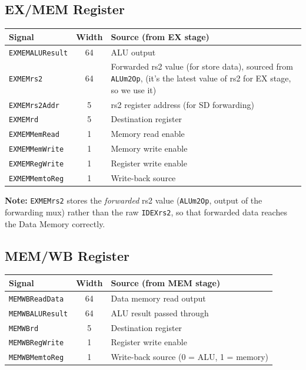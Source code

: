 \documentclass[12pt,a4paper]{article}
\begin{document}
\subsection{EX/MEM Register}
\begin{center}
\begin{tabular}{lcp{7cm}}
    \toprule
    \textbf{Signal} & \textbf{Width} & \textbf{Source (from EX stage)} \\
    \midrule
    \texttt{EXMEMALUResult} & 64 & ALU output \\
    \texttt{EXMEMrs2} & 64 & Forwarded rs2 value (for store data), sourced from \texttt{ALUm2Op}, (it's the latest value of rs2 for EX stage, so we use it) \\
    \texttt{EXMEMrs2Addr} & 5 & rs2 register address (for SD forwarding) \\
    \texttt{EXMEMrd} & 5 & Destination register \\
    \texttt{EXMEMMemRead} & 1 & Memory read enable \\
    \texttt{EXMEMMemWrite} & 1 & Memory write enable \\
    \texttt{EXMEMRegWrite} & 1 & Register write enable \\
    \texttt{EXMEMMemtoReg} & 1 & Write-back source \\
    \bottomrule
\end{tabular}
\end{center}

\textbf{Note:} \texttt{EXMEMrs2} stores the \emph{forwarded} rs2 value (\texttt{ALUm2Op}, output of the forwarding mux) rather than the raw \texttt{IDEXrs2}, so that forwarded data reaches the Data Memory correctly.

\subsection{MEM/WB Register}
\begin{center}
\begin{tabular}{lcp{7cm}}
    \toprule
    \textbf{Signal} & \textbf{Width} & \textbf{Source (from MEM stage)} \\
    \midrule
    \texttt{MEMWBReadData} & 64 & Data memory read output \\
    \texttt{MEMWBALUResult} & 64 & ALU result passed through \\
    \texttt{MEMWBrd} & 5 & Destination register \\
    \texttt{MEMWBRegWrite} & 1 & Register write enable \\
    \texttt{MEMWBMemtoReg} & 1 & Write-back source (0 = ALU, 1 = memory) \\
    \bottomrule
\end{tabular}
\end{center}
\end{document}
